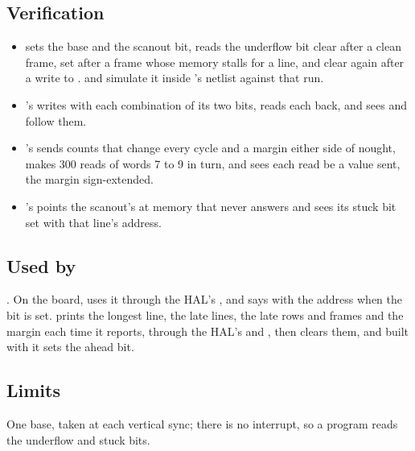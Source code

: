 \subsection*{Verification}

\begin{itemize}
\item {} sets the base and the scanout bit, reads the
underflow bit clear after a clean frame, set after a frame whose
memory stalls for a line, and clear again after a write to
.  and
 simulate it inside
's netlist against that run.
\item {}'s
 writes  with each
combination of its two bits, reads each back, and sees 
and  follow them.
\item {}'s
 sends
counts that change every cycle and a margin either side of nought,
makes 300 reads of words 7 to 9 in turn, and sees each read be a value
sent, the margin sign-extended.
\item {}'s
 points the scanout's
 at memory that never answers and sees its stuck bit
set with that line's address.
\end{itemize}

\subsection*{Used by}

. On the board, 
uses it through the HAL's , and says  with
the address when the bit is set. 
prints the longest line, the late lines, the late rows and frames and
the margin each time it reports, through the HAL's 
and , then clears them, and built with 
it sets the ahead bit.

\subsection*{Limits}

One base, taken at each vertical sync; there is no interrupt, so a
program reads the underflow and stuck bits.
